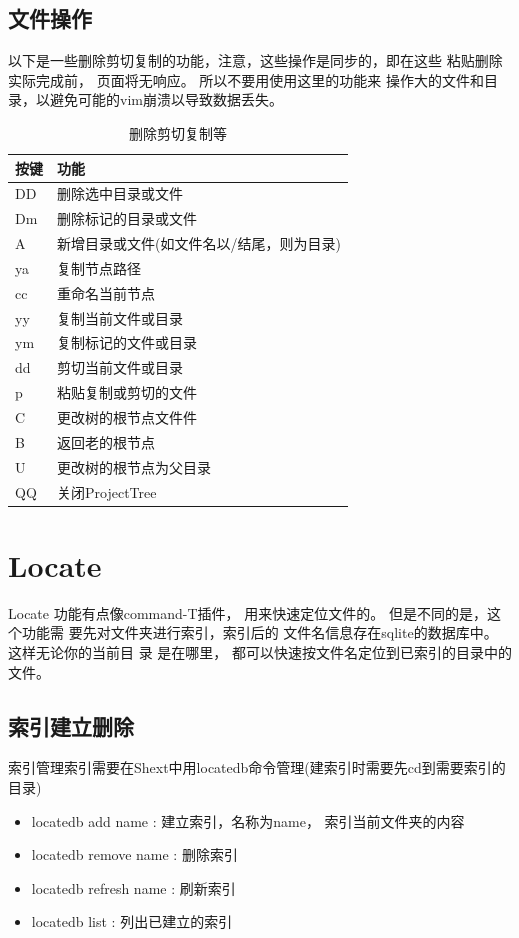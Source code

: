 \documentclass[oneside,openany]{book}
\begin{document}
  \subsection{文件操作}
  以下是一些删除剪切复制的功能，注意，这些操作是同步的，即在这些
粘贴删除实际完成前， 页面将无响应。 所以不要用使用这里的功能来
操作大的文件和目录，以避免可能的vim崩溃以导致数据丢失。
  \begin{table}[H]
  \caption{删除剪切复制等}
  \centering
      \begin{tabular}{p{40pt}p{220pt}}
        \toprule
        按键& 功能\\
        \midrule
          DD    &删除选中目录或文件\\
          Dm    &删除标记的目录或文件\\
          A     &新增目录或文件(如文件名以/结尾，则为目录)\\
          ya    &复制节点路径\\
          cc    &重命名当前节点\\
          yy    &复制当前文件或目录\\
          ym    &复制标记的文件或目录\\
          dd    &剪切当前文件或目录\\
          p     &粘贴复制或剪切的文件\\
          C     &更改树的根节点文件件\\
          B     &返回老的根节点\\
          U     &更改树的根节点为父目录\\
          QQ    &关闭ProjectTree\\
        \bottomrule
      \end{tabular}
  \end{table}

\section{Locate}

    Locate 功能有点像command-T插件， 用来快速定位文件的。 但是不同的是，这个功能需
要先对文件夹进行索引，索引后的 文件名信息存在sqlite的数据库中。 这样无论你的当前目
录 是在哪里， 都可以快速按文件名定位到已索引的目录中的文件。

\subsection{索引建立删除}
  索引管理索引需要在Shext中用locatedb命令管理(建索引时需要先cd到需要索引的目录) 
  \begin{itemize}
      \item locatedb add name : 建立索引，名称为name， 索引当前文件夹的内容
      \item locatedb remove name : 删除索引
      \item locatedb refresh name : 刷新索引
      \item locatedb list : 列出已建立的索引 
  \end{itemize}
\end{document}
